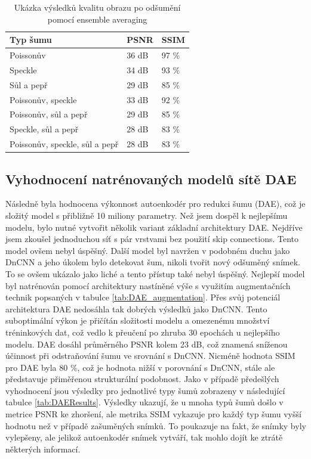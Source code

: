 \documentclass[male,czech,api_ing]{thesis}
\begin{document}
\begin{table}[h]
    \centering
    \begin{tabular}{|l|l|l|}
    \hline
    \textbf{Typ šumu}               & \textbf{PSNR} & \textbf{SSIM} \\ \hline
    Poissonův                       & 36 dB         &  97 \%        \\ \hline
    Speckle                         & 34 dB         &  93 \%        \\ \hline
    Sůl a pepř                      & 29 dB         &  85 \%        \\ \hline
    Poissonův, speckle              & 33 dB         &  92 \%        \\ \hline
    Poissonův, sůl a pepř           & 29 dB         &  85 \%        \\ \hline
    Speckle, sůl a pepř             & 28 dB         &  83 \%        \\ \hline
    Poissonův, speckle, sůl a pepř  & 28 dB         &  83 \%        \\ \hline
    \end{tabular}
    \caption{Ukázka výsledků kvalitu obrazu po odšumění pomocí ensemble averaging}
    \label{tab:DnCNNResults}
\end{table}

\subsection{Vyhodnocení natrénovaných modelů sítě DAE}
Následně byla hodnocena výkonnost autoenkodér pro redukci šumu (DAE), což je složitý model s přibližně 10 miliony parametry. Než jsem dospěl k nejlepšímu modelu, bylo nutné vytvořit několik variant základní architektury DAE. Nejdříve jsem zkoušel jednoduchou síť s pár vrstvami bez použití skip connections. Tento model ovšem nebyl úspěšný. Další model byl navržen v podobném duchu jako DnCNN a jeho úkolem bylo detekovat šum, nikoli tvořit nový odšuměný snímek. To se ovšem ukázalo jako liché a tento přístup také nebyl úspěšný. Nejlepší model byl natrénován pomocí architektury nastíněné výše s využitím augmentačních technik popsaných v tabulce \ref{tab:DAE_augmentation}. Přes svůj potenciál architektura DAE nedosáhla tak dobrých výsledků jako DnCNN. Tento suboptimální výkon je přičítán složitosti modelu a omezenému množství tréninkových dat, což vedlo k přeučení po zhruba 30 epochách u nejlepšího modelu. DAE dosáhl průměrného PSNR kolem 23 dB, což znamená sníženou účinnost při odstraňování šumu ve srovnání s DnCNN. Nicméně hodnota SSIM pro DAE byla 80 \%, což je hodnota nižší v porovnání s DnCNN, stále ale představuje přiměřenou strukturální podobnost. Jako v případě předešlých vyhodnocení jsou výsledky pro jednotlivé typy šumů zobrazeny v následující tabulce \ref{tab:DAEResults}. Výsledky ukazují, že u mnoha typů šumů došlo v metrice PSNR ke zhoršení, ale metrika SSIM vykazuje pro každý typ šumu vyšší hodnotu než v případě zašuměných snímků. To poukazuje na fakt, že snímky byly vylepšeny, ale jelikož autoenkodér snímek vytváří, tak mohlo dojít ke ztrátě některých informací.
\end{document}

